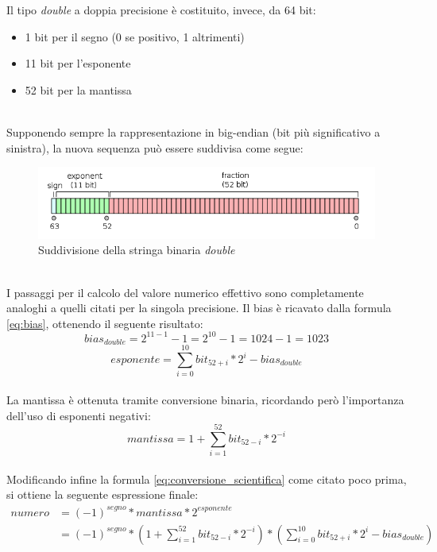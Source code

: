 \documentclass[Lau, oneside]{sapthesis}%
\begin{document}
\newpage
Il tipo \textit{double} a doppia precisione è costituito, invece, da 64 bit:
\begin{itemize}
    \item 1 bit per il segno (0 se positivo, 1 altrimenti)
    \item 11 bit per l'esponente
    \item 52 bit per la mantissa
\end{itemize}
\ \\
Supponendo sempre la rappresentazione in big-endian (bit più significativo a sinistra), la nuova sequenza può essere suddivisa come segue:
\newline
\begin{figure}[h]
\centering
\includegraphics[scale=0.6]{foto/double.png}
\caption{Suddivisione della stringa binaria \textit{double} \cite{ref:double}}
\end{figure}
\ \\ \newline
I passaggi per il calcolo del valore numerico effettivo sono completamente analoghi a quelli citati per la singola precisione.
\newline \newline
Il bias è ricavato dalla formula \eqref{eq:bias}, ottenendo il seguente risultato:
\ \\
\begin{equation}
    bias_{double} = 2^{11-1}-1 = 2^{10}-1 = 1024-1 = 1023
\end{equation}
\begin{equation}
   esponente = \sum_{i=0}^{10} bit_{52+i}*2^{i} - bias_{double}
\end{equation}
\ \\
\newline
La mantissa è ottenuta tramite conversione binaria, ricordando però l'importanza dell'uso di esponenti negativi:
\ \\
\begin{equation}
    mantissa = 1 + \sum_{i=1}^{52} bit_{52-i}*2^{-i} 
\end{equation}
\ \\
\newline
Modificando infine la formula \eqref{eq:conversione_scientifica} come citato poco prima, si ottiene la seguente espressione finale:
\begin{equation}
    \begin{aligned}
        numero &= (-1)^{segno} * mantissa * 2^{esponente} \\
        &= (-1)^{segno} *( 1 + \sum_{i=1}^{52} bit_{52-i}*2^{-i}) * (\sum_{i=0}^{10} bit_{52+i}*2^{i} - bias_{double})
    \end{aligned}
\end{equation}
\end{document}
